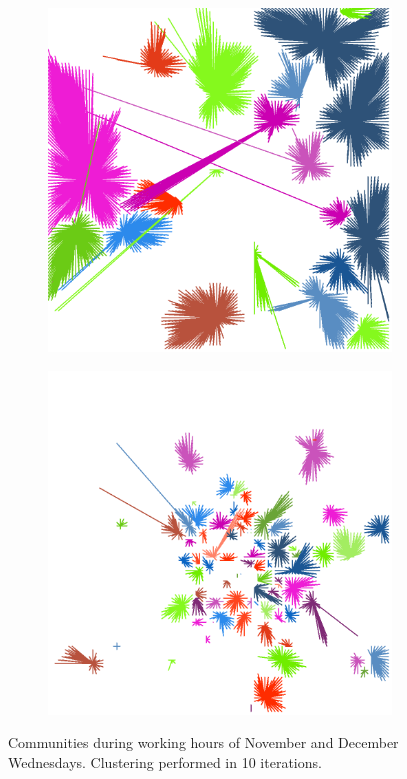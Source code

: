 \documentclass[12pt,a4paper]{article}
\begin{document}
\begin{figure}[H]
\begin{subfigure}[b]{0.3\textwidth}
\end{subfigure}
\begin{subfigure}[b]{0.3\textwidth}
\includegraphics[width=\textwidth]{weekDef/edges-3Wed-mid.png}
\end{subfigure}
\begin{subfigure}[b]{0.3\textwidth}
\includegraphics[width=\textwidth]{weekDef/edges-3Wed-small.png}
\end{subfigure}
\label{fig:wednesdayworking}
\caption{Communities during working hours of November and December Wednesdays. Clustering performed in 10 iterations.}
\end{figure}
\end{document}
